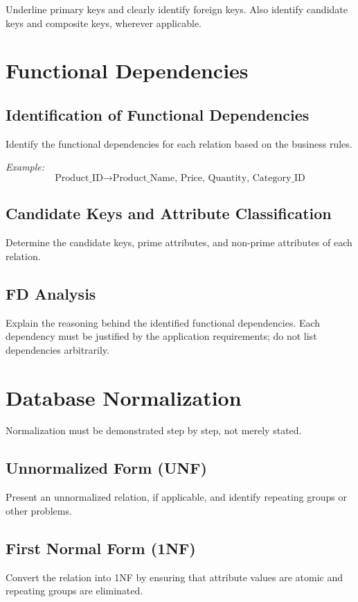 \documentclass[12pt,a4paper]{report}
\begin{document}
Underline primary keys and clearly identify foreign keys. Also identify candidate keys and composite keys, wherever applicable.

\chapter{Functional Dependencies}

\section{Identification of Functional Dependencies}
Identify the functional dependencies for each relation based on the business rules.

\noindent\textit{Example:}
\[
\text{Product\_ID} \rightarrow
\text{Product\_Name, Price, Quantity, Category\_ID}
\]

\section{Candidate Keys and Attribute Classification}
Determine the candidate keys, prime attributes, and non-prime attributes of each relation.

\section{FD Analysis}
Explain the reasoning behind the identified functional dependencies. Each dependency must be justified by the application requirements; do not list dependencies arbitrarily.

\chapter{Database Normalization}

Normalization must be demonstrated step by step, not merely stated.

\section{Unnormalized Form (UNF)}
Present an unnormalized relation, if applicable, and identify repeating groups or other problems.

\section{First Normal Form (1NF)}
Convert the relation into 1NF by ensuring that attribute values are atomic and repeating groups are eliminated.
\end{document}
